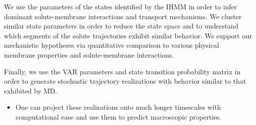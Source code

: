\documentclass[journal=jpcbfk,manuscript=article]{achemso}
\begin{document}
  We use the parameters of the states identified by the IHMM in order to infer 
  dominant solute-membrane interactions and transport mechanisms. We cluster similar 
  state parameters in order to reduce the state space and to understand which segments 
  of the solute trajectories exhibit similar behavior. We support our mechanistic 
  hypotheses via quantitative comparison to various physical membrane properties and
  solute-membrane interactions.
  
  Finally, we use the VAR parameters and state transition probability matrix in
  order to generate stochastic trajectory realizations with behavior similar to that
  exhibited by MD. 
  \begin{itemize}  
    \item One can project these realizations onto much longer timescales with 
    computational ease and use them to predict macroscopic properties.
  \end{itemize}
  
\end{document}
